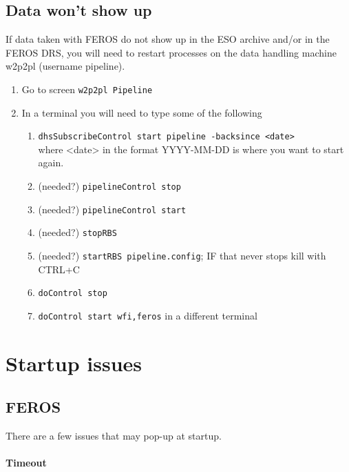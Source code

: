 \documentclass[11pt,fleqn,a4paper]{book}
\begin{document}
\subsection{Data won't show up}

If data taken with FEROS do not show up in the ESO archive and/or in the
FEROS DRS, you will need to restart processes on the data handling machine \gls{w2p2pl} (username pipeline).

\label{proc:DHrestart}
\begin{enumerate} 
    \item Go to screen \texttt{\gls{w2p2pl} Pipeline}
    \item In a terminal you will need to type some of the following
        \begin{enumerate}
            \item \texttt{dhsSubscribeControl start pipeline -backsince <date>}\\where <date> in the format YYYY-MM-DD is where you want to start again.
            \item (needed?) \texttt{pipelineControl stop}
            \item (needed?) \texttt{pipelineControl start}
            \item (needed?) \texttt{stopRBS}
            \item (needed?) \texttt{startRBS pipeline.config}; IF that never stops kill with CTRL+C
            \item \texttt{doControl stop}
            \item \texttt{doControl start wfi,feros} in a different terminal
        \end{enumerate}
\end{enumerate}

\section{Startup issues}

\subsection{FEROS}
\label{sec:ferosstartuptimeout}

There are a few issues that may pop-up at startup.

\paragraph{Timeout}
\end{document}

